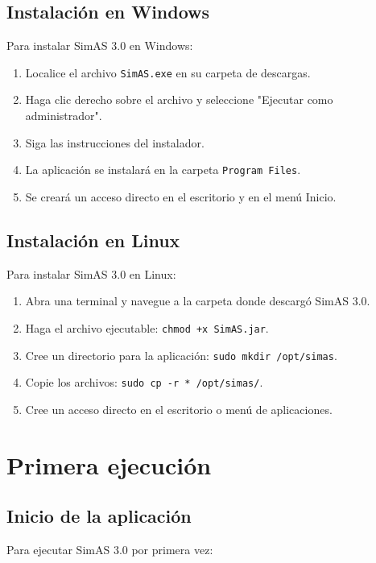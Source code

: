 \subsection{Instalación en Windows}

Para instalar SimAS 3.0 en Windows:

\begin{enumerate}
    \item Localice el archivo \texttt{SimAS.exe} en su carpeta de descargas.
    \item Haga clic derecho sobre el archivo y seleccione \string"Ejecutar como administrador\string".
    \item Siga las instrucciones del instalador.
    \item La aplicación se instalará en la carpeta \texttt{Program Files}.
    \item Se creará un acceso directo en el escritorio y en el menú Inicio.
\end{enumerate}

\subsection{Instalación en Linux}

Para instalar SimAS 3.0 en Linux:

\begin{enumerate}
    \item Abra una terminal y navegue a la carpeta donde descargó SimAS 3.0.
    \item Haga el archivo ejecutable: \texttt{chmod +x SimAS.jar}.
    \item Cree un directorio para la aplicación: \texttt{sudo mkdir /opt/simas}.
    \item Copie los archivos: \texttt{sudo cp -r * /opt/simas/}.
    \item Cree un acceso directo en el escritorio o menú de aplicaciones.
\end{enumerate}

\section{Primera ejecución}

\subsection{Inicio de la aplicación}

Para ejecutar SimAS 3.0 por primera vez:

